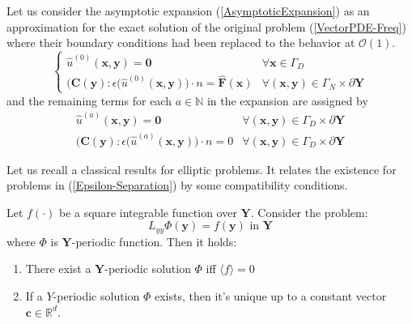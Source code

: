 Let us consider the asymptotic expansion (\ref{AsymptoticExpansion}) as an approximation for the exact solution of the original problem (\ref{VectorPDE-Freq}) where their boundary conditions had been replaced to the behavior at $\mathcal{O}(1)$.
\begin{equation*}
    \left \{
    \begin{array}{cc}   
        \hat{u}^{(0)}(\mathbf{x},\mathbf{y}) = \mathbf{0} & \forall \mathbf{x} \in \Gamma_D\\
        \big(\mathbf{C}(\mathbf{y}): \epsilon (\hat{u}^{(0)}(\mathbf{x}, \mathbf{y}) \big) \cdot n = \hat{\mathbf{F}}(\mathbf{x}) & \forall (\mathbf{x},\mathbf{y}) \in \Gamma_N \times \partial \mathbf{Y}
    \end{array}
    \right .
\end{equation*}
and the remaining terms for each $a \in \mathbb{N}$ in the expansion are assigned by
\begin{equation*}
    \begin{array}{cc}
        \hat{u}^{(a)}(\mathbf{x},\mathbf{y}) = \mathbf{0} & \forall (\mathbf{x}, \mathbf{y}) \in \Gamma_D\times \partial \mathbf{Y} \\
        \big( \mathbf{C}(\mathbf{y}): \epsilon(\hat{u}^{(a)}(\mathbf{x},\mathbf{y}) \big) \cdot n = 0 & \forall  (\mathbf{x}, \mathbf{y}) \in \Gamma_D\times \partial \mathbf{Y} 
    \end{array}
\end{equation*}

Let us recall a classical results for elliptic problems. It relates the existence for problems in (\ref{Epsilon-Separation}) by some compatibility conditions.
\begin{lem}
\label{ExistenceLemma}
Let $f(\cdot)$ be a square integrable function over $\mathbf{Y}$. Consider the problem:
\begin{equation*}
    L_{yy} \Phi(\mathbf{y}) = f(\mathbf{y}) \text{ in } \mathbf{Y}
\end{equation*}
where $\Phi$ is $\mathbf{Y}$-periodic function. Then it holds:
\begin{enumerate}
    \item There exist a $\mathbf{Y}$-periodic solution $\Phi$ iff $\langle f \rangle = 0$
    \item If a $Y$-periodic solution $\Phi$ exists, then it's unique up to a constant vector $\mathbf{c} \in \mathbb{R}^d$.
\end{enumerate}
\end{lem}

